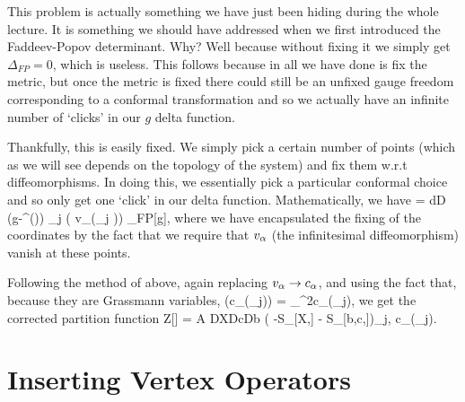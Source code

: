 This problem is actually something we have just been hiding during the whole lecture. It is something we should have addressed when we first introduced the Faddeev-Popov determinant. Why? Well because without fixing it we simply get $\Delta_{FP}=0$, which is useless. This follows because in  all we have done is fix the metric, but once the metric is fixed there could still be an unfixed gauge freedom corresponding to a conformal transformation and so we actually have an infinite number of `clicks' in our $g$ delta function. 

Thankfully, this is easily fixed. We simply pick a certain number of points (which as we will see depends on the topology of the system) and fix them w.r.t diffeomorphisms. In doing this, we essentially pick a particular conformal choice and so only get one `click' in our delta function. Mathematically, we have 
 = \int d\tau D\zeta \, \del\big(g-^{\zeta}(\tau)\big) \prod_j \del \big( v_{\a}(\Hat{\sig}_j )\big) \Delta_{FP}[g],
\ee 
where we have encapsulated the fixing of the coordinates by the fact that we require that $v_{\alpha}$ (the infinitesimal diffeomorphism) vanish at these points. 

Following the method of above, again replacing $v_{\alpha}\to c_{\alpha}$, and using the fact that, because they are Grassmann variables, 
\bse
    \del\big(c_{\a}(\hat{\sig}_j)\big) = \prod_{}^2c_{\a}(\hat{\sig}_j),
\ese 
we get the corrected partition function
\bse 
    Z[] = A \int DXDcDb \exp\Big( -S_{}[X,] - S_{}[b,c,]\Big)\prod_{j,\a} c_{\a}(\hat{\sig}_j).
\ese 

\section{Inserting Vertex Operators}
